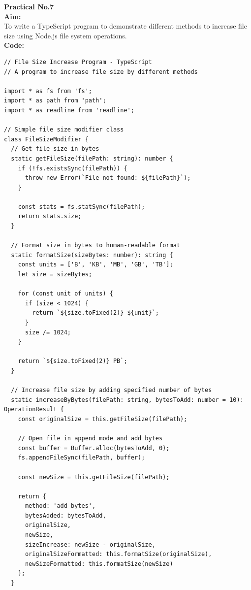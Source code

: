 \documentclass[a4paper,12pt]{article}
\begin{document}
{\fontsize{16}{19}\selectfont \textbf{Practical No.7}}\\[0.5cm]

{\fontsize{14}{17}\selectfont \textbf{Aim:}}\\[0.3cm]

{\fontsize{12}{14}\selectfont
To write a TypeScript program to demonstrate different methods to increase file size using Node.js file system operations.
}\\[1cm]

{\fontsize{14}{17}\selectfont \textbf{Code:}}\\[0.3cm]

\begin{verbatim}
// File Size Increase Program - TypeScript
// A program to increase file size by different methods

import * as fs from 'fs';
import * as path from 'path';
import * as readline from 'readline';

// Simple file size modifier class
class FileSizeModifier {
  // Get file size in bytes
  static getFileSize(filePath: string): number {
    if (!fs.existsSync(filePath)) {
      throw new Error(`File not found: ${filePath}`);
    }
    
    const stats = fs.statSync(filePath);
    return stats.size;
  }
  
  // Format size in bytes to human-readable format
  static formatSize(sizeBytes: number): string {
    const units = ['B', 'KB', 'MB', 'GB', 'TB'];
    let size = sizeBytes;
    
    for (const unit of units) {
      if (size < 1024) {
        return `${size.toFixed(2)} ${unit}`;
      }
      size /= 1024;
    }
    
    return `${size.toFixed(2)} PB`;
  }
  
  // Increase file size by adding specified number of bytes
  static increaseByBytes(filePath: string, bytesToAdd: number = 10): OperationResult {
    const originalSize = this.getFileSize(filePath);
    
    // Open file in append mode and add bytes
    const buffer = Buffer.alloc(bytesToAdd, 0);
    fs.appendFileSync(filePath, buffer);
    
    const newSize = this.getFileSize(filePath);
    
    return {
      method: 'add_bytes',
      bytesAdded: bytesToAdd,
      originalSize,
      newSize,
      sizeIncrease: newSize - originalSize,
      originalSizeFormatted: this.formatSize(originalSize),
      newSizeFormatted: this.formatSize(newSize)
    };
  }
  

\end{verbatim}
\end{document}

